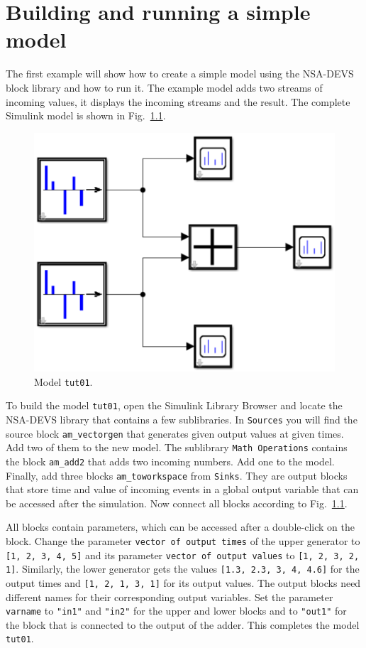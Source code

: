 \documentclass[12pt,oneside,a4paper,bibtotoc,BCOR=0pt,DIV=20]{scrreprt}
\newcommand{\cft}[1]{\mbox{\texttt{#1}}}   %
\begin{document}
 
\chapter{Building and running a simple model} \label{sec3}

The first example will show how to create a simple model using the NSA-DEVS
block library and how to run it. The example model adds two streams of incoming
values, it displays the incoming streams and the result. The complete Simulink
model is shown in Fig.\ \ref{fig_2}.
\begin{figure}[ht]
\centering
\includegraphics[width=0.34\columnwidth]{images/bild02.pdf}
\caption{Model \cft{tut01}.}
\label{fig_2}
\end{figure}

To build the model \cft{tut01}, open the Simulink Library Browser and locate
the NSA-DEVS library that contains a few sublibraries. In \cft{Sources} you
will find the source block \cft{am\_vectorgen} that generates given output
values at given times. Add two of them to the new model. The sublibrary
\cft{Math Operations} contains the block \cft{am\_add2} that adds two incoming
numbers. Add one to the model. Finally, add three blocks \cft{am\_toworkspace}
from \cft{Sinks}. They are output blocks that store time and value of incoming
events in a global output variable that can be accessed after the
simulation. Now connect all blocks according to Fig.\ \ref{fig_2}.

All blocks contain parameters, which can be accessed after a double-click on
the block. Change the parameter \cft{vector of output times} of the upper
generator to \cft{[1, 2, 3, 4, 5]} and its parameter \cft{vector of output
  values} to \cft{[1, 2, 3, 2, 1]}. Similarly, the lower generator gets the
values \cft{[1.3, 2.3, 3, 4, 4.6]} for the output times and \cft{[1, 2, 1, 3,
    1]} for its output values. The output blocks need different names for their
corresponding output variables. Set the parameter \cft{varname} to \cft{"in1"}
and \cft{"in2"} for the upper and lower blocks and to \cft{"out1"} for the
block that is connected to the output of the adder. This completes the model
\cft{tut01}.
\end{document}
